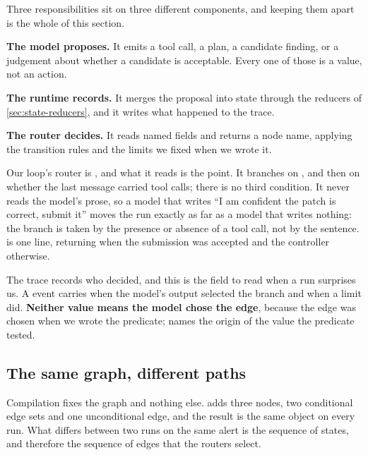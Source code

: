 Three responsibilities sit on three different components, and keeping them apart is the whole of
this section.

\bi

\item \textbf{The model proposes.} It emits a tool call, a plan, a candidate finding, or a judgement
about whether a candidate is acceptable. Every one of those is a value, not an action.

\item \textbf{The runtime records.} It merges the proposal into state through the reducers of
\cref{sec:state-reducers}, and it writes what happened to the trace.

\item \textbf{The router decides.} It reads named fields and returns a node name, applying the
transition rules and the limits we fixed when we wrote it.

\ei

Our loop's router is , and what it reads is the point. It branches on
, and then on whether the last message carried tool calls; there is no third
condition. It never reads the model's prose, so a model that writes ``I am confident the patch is
correct, submit it'' moves the run exactly as far as a model that writes nothing: the branch is
taken by the presence or absence of a tool call, not by the sentence.  is one
line, returning  when the submission was accepted and the controller otherwise.

The trace records who decided, and this is the field to read when a run surprises us. A
 event carries  when the model's output selected the branch
and  when a limit did. \textbf{Neither value means the model chose the edge},
because the edge was chosen when we wrote the predicate;  names the origin of
the value the predicate tested.

\subsection{The same graph, different paths}
\label{sec:control-paths}

Compilation fixes the graph and nothing else.  adds three nodes, two conditional
edge sets and one unconditional edge, and the result is the same object on every run. What differs
between two runs on the same alert is the sequence of states, and therefore the sequence of edges
that the routers select.

